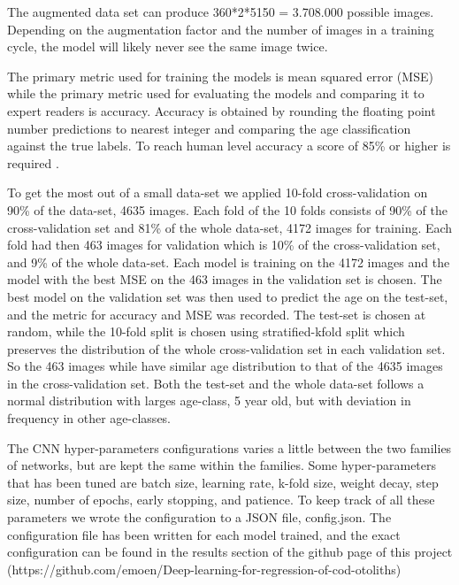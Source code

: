 \documentclass[10pt,letterpaper]{article}
\begin{document}
The augmented data set can produce 360*2*5150 = 3.708.000 possible images.
Depending on the augmentation factor and the number of images in a training cycle, the model will likely never see the same image twice.

The primary metric used for training the models is mean squared error (MSE)
while the primary metric used for evaluating the models and comparing it to expert readers is accuracy. Accuracy is obtained by rounding the floating point number predictions to nearest integer and comparing the age classification against the true labels.
To reach human level accuracy a score of 85\% or higher is required \citep{ref_needed}.

To get the most out of a small data-set we applied 10-fold cross-validation on 90\% of the data-set, 4635 images. Each fold of the 10 folds consists of 90\% of the cross-validation set and 81\% of the whole data-set, 4172 images for training. Each fold had then 463 images for validation which is 10\% of the cross-validation set, and 9\% of the whole data-set. Each model is training on the 4172 images and the model with the best MSE on the 463 images in the validation set is chosen. The best model on the validation set was then used to predict the age on the test-set, and the metric for accuracy and MSE was recorded. The test-set is chosen at random, while the 10-fold split is chosen using stratified-kfold split which preserves the distribution of the whole cross-validation set in each validation set. So the 463 images while have similar age distribution to that of the 4635 images in the cross-validation set. Both the test-set and the whole data-set follows a normal distribution with larges age-class, 5 year old, but with deviation in frequency in other age-classes.

The CNN hyper-parameters configurations varies a little between the two families of networks, but are kept the same within the families. Some hyper-parameters
that has been tuned are batch size, learning rate, k-fold size, weight decay, step size, number of epochs, early stopping, and
patience. To keep track of all these parameters we wrote the configuration to a JSON file, config.json. The configuration file has been written for each model trained, and the exact configuration can be found in the results section of the github page of this project (https://github.com/emoen/Deep-learning-for-regression-of-cod-otoliths)
\end{document}
